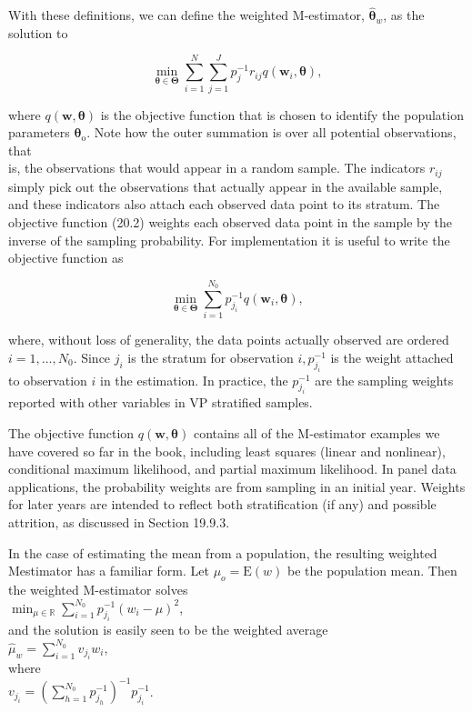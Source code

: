 \documentclass[10pt]{article}
\begin{document}
With these definitions, we can define the weighted M-estimator, $\hat{\boldsymbol{\theta}}_{w}$, as the solution to


\begin{equation*}
\min _{\boldsymbol{\theta} \in \boldsymbol{\Theta}} \sum_{i=1}^{N} \sum_{j=1}^{J} p_{j}^{-1} r_{i j} q\left(\mathbf{w}_{i}, \boldsymbol{\theta}\right), \tag{20.2}
\end{equation*}


where $q(\mathbf{w}, \boldsymbol{\theta})$ is the objective function that is chosen to identify the population parameters $\boldsymbol{\theta}_{\mathrm{o}}$. Note how the outer summation is over all potential observations, that\\
is, the observations that would appear in a random sample. The indicators $r_{i j}$ simply pick out the observations that actually appear in the available sample, and these indicators also attach each observed data point to its stratum. The objective function (20.2) weights each observed data point in the sample by the inverse of the sampling probability. For implementation it is useful to write the objective function as


\begin{equation*}
\min _{\boldsymbol{\theta} \in \boldsymbol{\Theta}} \sum_{i=1}^{N_{0}} p_{j_{i}}^{-1} q\left(\mathbf{w}_{i}, \boldsymbol{\theta}\right), \tag{20.3}
\end{equation*}


where, without loss of generality, the data points actually observed are ordered $i= 1, \ldots, N_{0}$. Since $j_{i}$ is the stratum for observation $i, p_{j_{i}}^{-1}$ is the weight attached to observation $i$ in the estimation. In practice, the $p_{j_{i}}^{-1}$ are the sampling weights reported with other variables in VP stratified samples.

The objective function $q(\mathbf{w}, \boldsymbol{\theta})$ contains all of the M-estimator examples we have covered so far in the book, including least squares (linear and nonlinear), conditional maximum likelihood, and partial maximum likelihood. In panel data applications, the probability weights are from sampling in an initial year. Weights for later years are intended to reflect both stratification (if any) and possible attrition, as discussed in Section 19.9.3.

In the case of estimating the mean from a population, the resulting weighted Mestimator has a familiar form. Let $\mu_{o}=\mathrm{E}(w)$ be the population mean. Then the weighted M-estimator solves\\
$\min _{\mu \in \mathbb{R}} \sum_{i=1}^{N_{0}} p_{j_{i}}^{-1}\left(w_{i}-\mu\right)^{2}$,\\
and the solution is easily seen to be the weighted average\\
$\hat{\mu}_{w}=\sum_{i=1}^{N_{0}} v_{j_{i}} w_{i}$,\\
where\\
$v_{j_{i}}=\left(\sum_{h=1}^{N_{0}} p_{j_{h}}^{-1}\right)^{-1} p_{j_{i}}^{-1}$.
\end{document}
